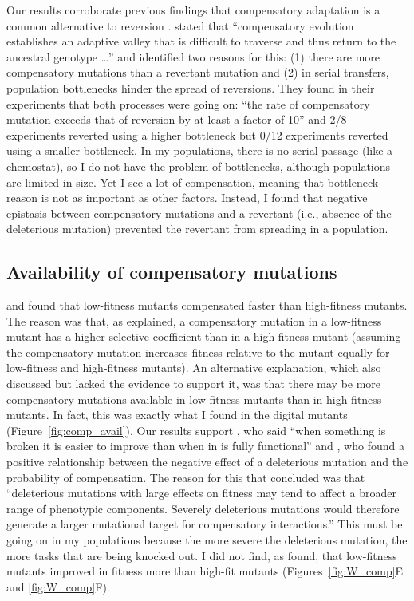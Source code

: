 \begin{doublespace}
Our results corroborate previous findings that compensatory adaptation
is a common alternative to reversion \citep{bur99,moo00,lev00,mai02,est11}.
%
\citet{lev00} stated that ``compensatory evolution
establishes an adaptive valley that is difficult to traverse and thus return to
the ancestral genotype \ldots'' and identified two reasons for this:
(1) there are more compensatory mutations than a revertant mutation and
(2) in serial transfers, population bottlenecks hinder the spread of reversions.
%
They found in their experiments that both processes were going on: ``the rate
of compensatory mutation exceeds that of reversion by at least a factor of 10''
and 2/8 experiments reverted using a higher bottleneck but 0/12 experiments
reverted using a smaller bottleneck.
%
In my populations, there is no serial passage (like a chemostat), so I do
not have the problem of bottlenecks, although populations are limited in size.
%
Yet I see a lot of compensation, meaning that bottleneck
reason is not as important as other factors.
%
Instead, I found that negative epistasis between compensatory mutations
and a revertant (i.e., absence of the deleterious mutation)
prevented the revertant from spreading in a population.



\subsection{Availability of compensatory mutations}

\citet{moo00} and \citet{san05}
found that low-fitness mutants compensated faster than high-fitness mutants.
%
The reason was that, as \citet{moo00} explained,
a compensatory mutation in a low-fitness mutant
has a higher selective coefficient than in a high-fitness mutant
(assuming the compensatory mutation increases fitness relative to the mutant
equally for low-fitness and high-fitness mutants).
%
An alternative explanation,
which \citet{moo00} also discussed
but lacked the evidence to support it,
was that there may be more compensatory mutations available
in low-fitness mutants than in high-fitness mutants.
%
In fact, this was exactly what I found
in the digital mutants (Figure~\ref{fig:comp_avail}).
%
Our results support \citet{whi03},
who said ``when something is broken it is easier to improve than
when in is fully functional'' and \citet{poo05b},
who found a positive relationship between the negative effect
of a deleterious mutation and the probability of compensation.
%
The reason for this that \citet{poo05b} concluded was that
``deleterious mutations with large effects
on fitness may tend to affect a broader range of phenotypic components.
Severely deleterious mutations would therefore generate a larger
mutational target for compensatory interactions.''
%
This must be going on in my populations because the more severe
the deleterious mutation, the more tasks that are being knocked out.
%
I did not find, as \citet{san05} found,
that low-fitness mutants improved in fitness more than high-fit mutants
(Figures~\ref{fig:W_comp}E and \ref{fig:W_comp}F).




\end{doublespace}
